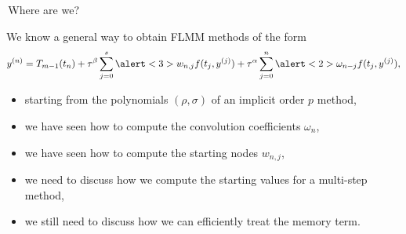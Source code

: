 \documentclass[aspectratio=169,xcolor=dvipsnames]{beamer}
\begin{document}
\begin{frame}{\faCompass\,Where are we?}

We know a general way to obtain FLMM methods of the form
\[
y^{(n)} = T_{m-1}(t_n) + \tau^\beta \sum_{j=0}^{s} \alert<3>{w_{n,j}} f(t_j,y^{(j)}) + \tau^\alpha \sum_{j=0}^{n} \alert<2>{\omega_{n-j}} f(t_j,y^{(j)}),
\]
\begin{itemize}
	\item[\textcolor{success}{\faCheckCircle}]<1-> starting from the polynomials $(\rho,\sigma)$ of an implicit order $p$ method,
	\item[\textcolor{success}{\faCheckCircle}]<2-> we have seen how to compute the convolution coefficients $\omega_n$,
	\item[\textcolor{success}{\faCheckCircle}]<3-> we have seen how to compute the starting nodes $w_{n,j}$,
	\item[\textcolor{todo}{\faClipboardList}]<4-> we need to discuss how we compute the starting values for a multi-step method,
	\item[\textcolor{todo}{\faClipboardList}]<5-> we still need to discuss how we can efficiently treat the memory term.
\end{itemize}

\end{frame}
%
\end{document}
